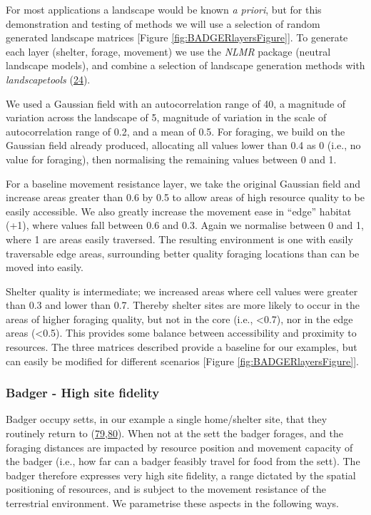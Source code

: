 \documentclass[10pt,a4paper]{article}
\begin{document}
For most applications a landscape would be known \emph{a priori}, but for this demonstration and testing of methods we will use a selection of random generated landscape matrices {[}Figure \ref{fig:BADGERlayersFigure}{]}.
To generate each layer (shelter, forage, movement) we use the \emph{NLMR} package (neutral landscape models), and combine a selection of landscape generation methods with \emph{landscapetools} (\protect\hyperlink{ref-Sciaini2018}{24}).

We used a Gaussian field with an autocorrelation range of 40, a magnitude of variation across the landscape of 5, magnitude of variation in the scale of autocorrelation range of 0.2, and a mean of 0.5.
For foraging, we build on the Gaussian field already produced, allocating all values lower than 0.4 as 0 (i.e., no value for foraging), then normalising the remaining values between 0 and 1.

For a baseline movement resistance layer, we take the original Gaussian field and increase areas greater than 0.6 by 0.5 to allow areas of high resource quality to be easily accessible.
We also greatly increase the movement ease in ``edge'' habitat (+1), where values fall between 0.6 and 0.3.
Again we normalise between 0 and 1, where 1 are areas easily traversed.
The resulting environment is one with easily traversable edge areas, surrounding better quality foraging locations than can be moved into easily.

Shelter quality is intermediate; we increased areas where cell values were greater than 0.3 and lower than 0.7.
Thereby shelter sites are more likely to occur in the areas of higher foraging quality, but not in the core (i.e., \textless0.7), nor in the edge areas (\textless0.5).
This provides some balance between accessibility and proximity to resources.
The three matrices described provide a baseline for our examples, but can easily be modified for different scenarios {[}Figure \ref{fig:BADGERlayersFigure}{]}.

\hypertarget{badger---high-site-fidelity}{%
\subsubsection{Badger - High site fidelity}\label{badger---high-site-fidelity}}

Badger occupy setts, in our example a single home/shelter site, that they routinely return to (\protect\hyperlink{ref-kowalczyk_daily_2006}{79},\protect\hyperlink{ref-feore_habitat_1999}{80}).
When not at the sett the badger forages, and the foraging distances are impacted by resource position and movement capacity of the badger (i.e., how far can a badger feasibly travel for food from the sett).
The badger therefore expresses very high site fidelity, a range dictated by the spatial positioning of resources, and is subject to the movement resistance of the terrestrial environment.
We parametrise these aspects in the following ways.
\end{document}
